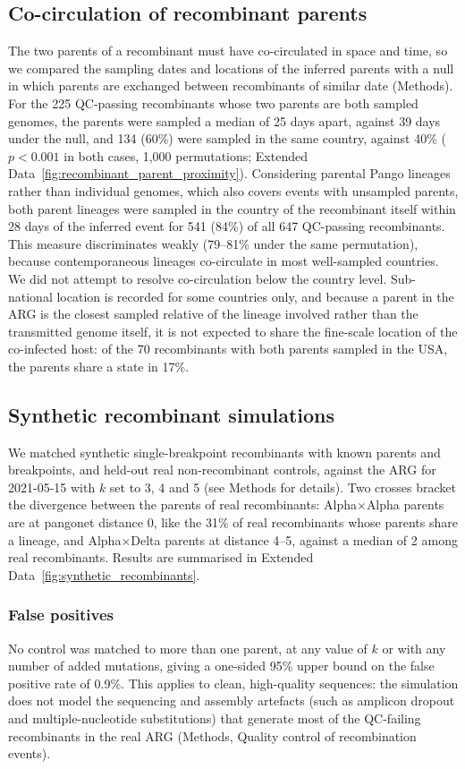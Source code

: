 \documentclass[12pt]{article}
\newcommand{\edref}[1]{Extended Data~\ref{#1}}
\begin{document}
\subsection{Co-circulation of recombinant parents}\label{sec:parent_cocirculation}
The two parents of a recombinant must have co-circulated in space and time,
so we compared the sampling dates and locations of the inferred parents
with a null in which parents are exchanged between recombinants
of similar date (Methods).
For the 225 QC-passing recombinants whose two parents are both sampled genomes,
the parents were sampled a median of 25 days apart,
against 39 days under the null,
and 134 (60\%) were sampled in the same country, against 40\%
($p < 0.001$ in both cases, 1,000 permutations;
\edref{fig:recombinant_parent_proximity}).
Considering parental Pango lineages rather than individual genomes,
which also covers events with unsampled parents,
both parent lineages were sampled in the country of the recombinant itself
within 28 days of the inferred event
for 541 (84\%) of all 647 QC-passing recombinants.
This measure discriminates weakly (79--81\% under the same permutation),
because contemporaneous lineages co-circulate
in most well-sampled countries.
We did not attempt to resolve co-circulation below the country level.
Sub-national location is recorded for some countries only,
and because a parent in the ARG is the closest sampled relative
of the lineage involved rather than the transmitted genome itself,
it is not expected to share the fine-scale location of the co-infected host:
of the 70 recombinants with both parents sampled in the USA,
the parents share a state in 17\%.

\subsection{Synthetic recombinant simulations}\label{sec:synthetic_recombinants}
We matched synthetic single-breakpoint recombinants with known parents
and breakpoints, and held-out real non-recombinant controls, against the ARG
for 2021-05-15 with $k$ set to 3, 4 and 5 (see Methods for details).
Two crosses bracket the divergence between the parents of real recombinants:
Alpha$\times$Alpha parents are at pangonet distance 0,
like the 31\% of real recombinants whose parents share a lineage,
and Alpha$\times$Delta parents at distance 4--5, against a median of 2
among real recombinants.
Results are summarised in \edref{fig:synthetic_recombinants}.

\subsubsection{False positives}
No control was matched to more than one parent, at any value of $k$
or with any number of added mutations,
giving a one-sided 95\% upper bound on the false positive rate of 0.9\%.
This applies to clean, high-quality sequences: the simulation does not model
the sequencing and assembly artefacts (such as amplicon dropout and
multiple-nucleotide substitutions) that generate most of the
QC-failing recombinants in the real ARG
(Methods, Quality control of recombination events).
\end{document}
